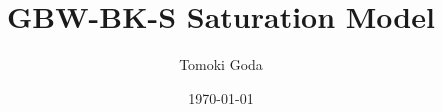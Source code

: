 \documentclass[12pt]{article}
\begin{document}
	
\author{Tomoki Goda}
\title{GBW-BK-S Saturation Model}
\date{\today}

\maketitle
	
\tableofcontents
{}





\newpage
\printbibliography
\end{document}
